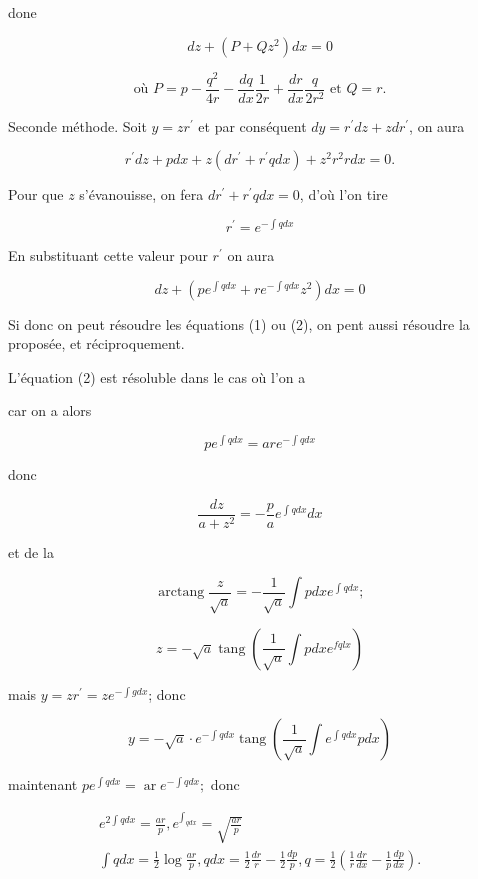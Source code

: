 \documentclass{article}
\begin{document}
done

\[
d z+\left(P+Q z^{2}\right) d x=0
\]

\[
\text { où } P=p-\frac{q^{2}}{4 r}-\frac{d q}{d x} \frac{1}{2 r}+\frac{d r}{d x} \frac{q}{2 r^{2}} \text { et } Q=r \text {. }
\]

Seconde méthode. Soit \(y=z r^{\prime}\) et par conséquent \(d y=r^{\prime} d z+z d r^{\prime}\), on aura

\[
r^{\prime} d z+p d x+z\left(d r^{\prime}+r^{\prime} q d x\right)+z^{2} r^{2} r d x=0 .
\]

Pour que \(z\) s'évanouisse, on fera \(d r^{\prime}+r^{\prime} q d x=0\), d'où l'on tire

\[
r^{\prime}=e^{-\int q d x}
\]

En substituant cette valeur pour \(r^{\prime}\) on aura

\[
d z+\left(p e^{\int q d x}+r e^{-\int q d x} z^{2}\right) d x=0
\]

Si donc on peut résoudre les équations (1) ou (2), on pent aussi résoudre la proposée, et réciproquement.

L'équation (2) est résoluble dans le cas où l'on a

car on a alors

\[
p e^{\int q d x}=a r e^{-\int q d x}
\]

donc

\[
\frac{d z}{a+z^{2}}=-\frac{p}{a} e^{\int q d x} d x
\]

et de la

\[
\operatorname{arctang} \frac{z}{\sqrt{a}}=-\frac{1}{\sqrt{a}} \int p d x e^{\int q d x} ;
\]

\[
z=-\sqrt{a} \operatorname{tang}\left(\frac{1}{\sqrt{a}} \int p d x e^{f q l x}\right)
\]

mais \(y=z r^{\prime}=z e^{-\int g d x}\); donc

\[
y=-\sqrt{a} \cdot e^{-\int q d x} \operatorname{tang}\left(\frac{1}{\sqrt{a}} \int e^{\int q d x} p d x\right)
\]

maintenant \(p e^{\int q d x}=\operatorname{ar} e^{-\int q d x} ;\) donc

\[
\begin{gathered}
e^{2 \int q d x}=\frac{a r}{p}, e^{\int_{q d x}}=\sqrt{\frac{a r}{p}} \\
\int q d x=\frac{1}{2} \log \frac{a r}{p}, q d x=\frac{1}{2} \frac{d r}{r}-\frac{1}{2} \frac{d p}{p}, q=\frac{1}{2}\left(\frac{1}{r} \frac{d r}{d x}-\frac{1}{p} \frac{d p}{d x}\right) .
\end{gathered}
\]
\end{document}

